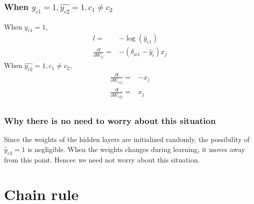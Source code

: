 \documentclass{article}
\begin{document}
\subsubsection{When $y_{c1} = 1, \hat{y_{c2}} = 1, c_{1} \ne c_{2}$}
When $y_{c1} = 1$, 
\begin{align*}
  l =& -\log(\hat{y}_{c1}) \\
  \frac{\partial l}{\partial W_{ij}} =& -(\delta_{ic1} - \hat{y}_{i})x_{j}
\end{align*}
When $\hat{y_{c2}} = 1, c_{1} \ne c_{2}$, 
\begin{align*}
  \frac{\partial l}{\partial W_{c1j}} =& -x_{j} \\
  \frac{\partial l}{\partial W_{c2j}} =& x_{j} \\
\end{align*}

\subsubsection{Why there is no need to worry about this situation}
Since the weights of the hidden layers are initialized randomly, the possibility of $\hat{y}_{c2} = 1 $ is negligible.  When the weights changes during learning, it moves away from this point.  Hencec we need not worry about this situation.

\section{Chain rule}
\end{document}
